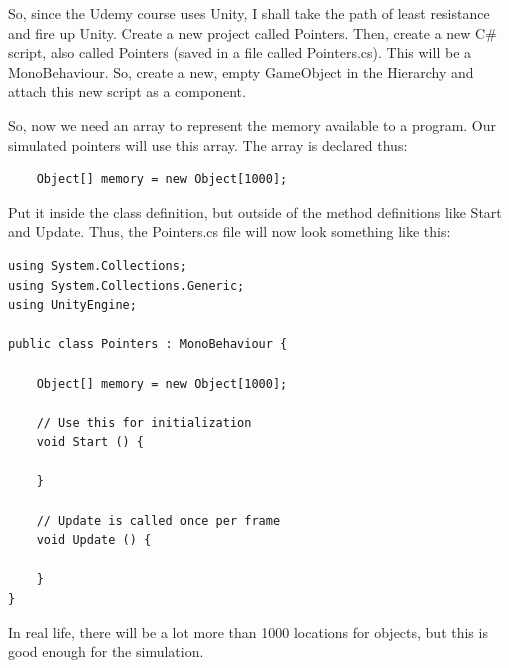 \documentclass[letter,12pt]{article}
\begin{document}
So, since the Udemy course uses Unity, I shall take the path of least resistance and fire up Unity.  Create a new project called Pointers.  Then, create a new C\# script, also called Pointers (saved in a file called Pointers.cs).  This will be a MonoBehaviour.  So, create a new, empty GameObject in the Hierarchy and attach this new script as a component.

So, now we need an array to represent the memory available to a program. Our simulated pointers will use this array.  The array is declared thus:

\begin{verbatim}
    Object[] memory = new Object[1000];
\end{verbatim}

Put it inside the class definition, but outside of the method definitions like Start and Update.  Thus, the Pointers.cs file will now look something like this:

\begin{verbatim}
using System.Collections;
using System.Collections.Generic;
using UnityEngine;

public class Pointers : MonoBehaviour {

    Object[] memory = new Object[1000];

	// Use this for initialization
	void Start () {
		
	}
	
	// Update is called once per frame
	void Update () {
		
	}
}
\end{verbatim}

In real life, there will be a lot more than 1000 locations for objects, but this is good enough for the simulation.
\end{document}
